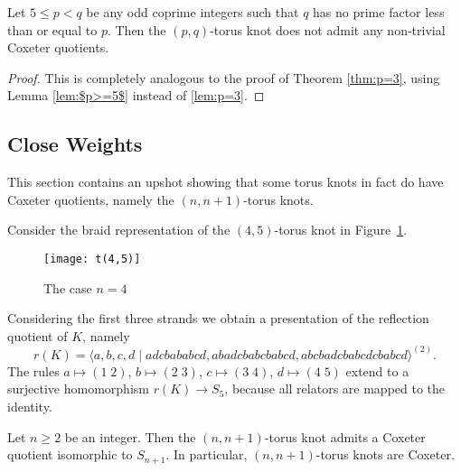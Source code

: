 \documentclass[main.tex]{subfiles}
\begin{document}
\begin{theorem}
Let $5 \leq p < q$ be any odd coprime integers such that $q$ has no prime factor less than or equal to $p$. Then the $(p, q)$-torus knot does not admit any non-trivial Coxeter quotients.
\end{theorem}

\begin{proof}
This is completely analogous to the proof of Theorem \ref{thm:p=3}, using Lemma \ref{lem:$p>=5$} instead of \ref{lem:p=3}.
\end{proof}



\subsection{Close Weights}\label{subsec:close-weights}
This section contains an upshot showing that some torus knots in fact do have Coxeter quotients, namely the $(n, n + 1)$-torus knots.

\begin{example}[$n=4$]
Consider the braid representation of the $(4, 5)$-torus knot in Figure~\ref{fig:torus45}.

\begin{figure}[ht]
\centering
\texttt{[image: t(4,5)]}
\caption{The case $n = 4$}
\label{fig:torus45}
\end{figure}

Considering the first three strands we obtain a presentation of the reflection quotient of $K$, namely
$$r(K) = \langle a, b, c, d \; | \; adcbababcd, abadcbabcbabcd, abcbadcbabcdcbabcd \rangle^{(2)}.$$
The rules $a \mapsto (1 \; 2)$, $b \mapsto (2 \; 3)$, $c \mapsto (3 \; 4)$, $d \mapsto (4 \; 5)$ extend to a surjective homomorphism $r(K) \rightarrow S_5$, because all relators are mapped to the identity.
\end{example}

\begin{theorem}
Let $n \geq 2$ be an integer. Then the $(n, n+1)$-torus knot admits a Coxeter quotient isomorphic to $S_{n+1}$. In particular, $(n, n+1)$-torus knots are Coxeter.
\end{theorem}
\end{document}
